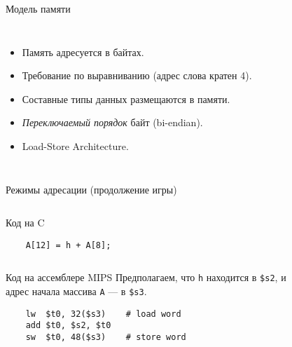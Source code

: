 \begin{frame}{Модель памяти}
\begin{columns}
    \column{6.5cm}
\pause
\begin{itemize}[<+->]
    \item Память адресуется в байтах.
    \item Требование по выравниванию (адрес слова кратен 4).
    \item Составные типы данных размещаются в памяти.
    \item \emph{Переключаемый порядок} байт
    (bi-endian).
    \item Load-Store Architecture.
\end{itemize}
\pause
    \column{5cm}
\end{columns}

\end{frame}

\begin{frame}[fragile]{Режимы адресации (продолжение игры)}
\begin{columns}
    \column{5.5cm}
\begin{block}{Код на C}
\begin{verbatim}
    A[12] = h + A[8];\end{verbatim}
\end{block}

    \column{5.5cm}
\end{columns}

\begin{columns}
    \column{9cm}

\begin{block}{Код на ассемблере MIPS}
Предполагаем, что \texttt{h} находится в \texttt{\$s2}, и\\
адрес начала массива \texttt{A} — в \texttt{\$s3}.
\pause
\begin{verbatim}
    lw  $t0, 32($s3)    # load word
    add $t0, $s2, $t0
    sw  $t0, 48($s3)    # store word\end{verbatim}
\end{block}
    \column{2cm}
\end{columns}
\end{frame}

